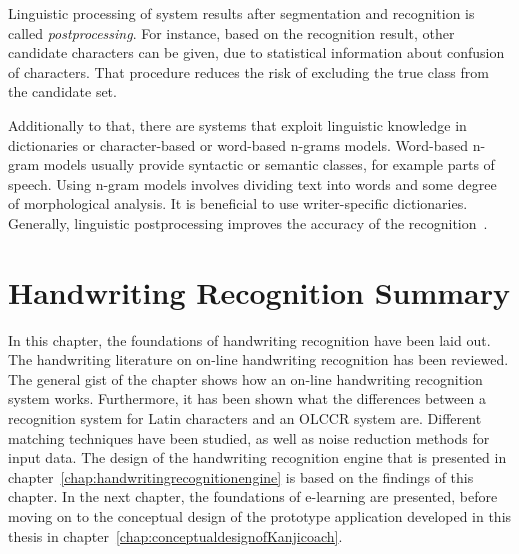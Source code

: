 Linguistic processing of system results after segmentation and recognition
is called \emph{postprocessing}. For instance, based on the recognition result,
other candidate characters can be given, due to statistical information about 
confusion of characters. That procedure reduces the risk of excluding the
true class from the candidate set.

Additionally to that, there are systems that exploit linguistic 
knowledge in dictionaries or character-based or word-based n-grams 
models. Word-based n-gram models usually provide syntactic or semantic classes, 
for example parts of speech. Using n-gram models involves dividing text into 
words and some degree of morphological analysis. It is beneficial to use 
writer-specific dictionaries. Generally, linguistic postprocessing improves
the accuracy of the recognition~.

\section{Handwriting Recognition Summary}
\label{sec:handwritingsummary}

In this chapter, the foundations of handwriting recognition have been laid out.
The handwriting literature on on-line handwriting recognition has been reviewed.
The general gist of the chapter shows how an on-line handwriting recognition
system works. Furthermore, it has been shown what the differences between a 
recognition system for Latin characters and an OLCCR system are.
Different matching techniques have been studied, as well as noise 
reduction methods for input data.
The design of the handwriting recognition engine that is presented in 
chapter~\ref{chap:handwritingrecognitionengine} is based on the findings 
of this chapter. In the next chapter, the foundations of e-learning 
are presented, before moving on to the conceptual design of the prototype
application developed in this thesis in 
chapter~\ref{chap:conceptualdesignofKanjicoach}.

